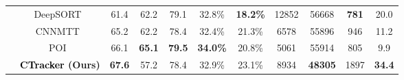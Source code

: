 \documentclass[../arXiv_main.tex]{subfiles}
\newcommand{\yang}[1]{\textcolor{black}{#1}}
\begin{document}
\begin{table}[t!]
{{\begin{tabular}{|c|c|cccccccc|c|}
& DeepSORT~\cite{wojke2017simple} & 61.4 & 62.2 & 79.1 & 32.8\% & {\bf 18.2\%} & 12852 & 56668 & {\bf 781} & 20.0\\
& CNNMTT~\cite{mahmoudi2019multi} & 65.2 & 62.2 & 78.4 & 32.4\% & 21.3\% & 6578 & 55896 & 946 & 11.2\\
& POI~\cite{yu2016poi} & 66.1 & {\bf 65.1} & {\bf 79.5} & {\bf 34.0\%} & 20.8\% & 5061 & 55914 & 805 & 9.9\\
& {\bf \yang{CTracker} (Ours)} & {\bf 67.6} & 57.2 & 78.4 & 32.9\%& 23.1\% & {8934} & {\bf 48305} & 1897 & {\bf 34.4}\\
\hline
\end{tabular}}}
\end{table}
\end{document}
